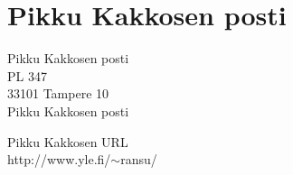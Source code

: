 \section{Pikku Kakkosen posti}

Pikku Kakkosen posti\\
PL 347\\
33101 Tampere 10\\
Pikku Kakkosen posti

Pikku Kakkosen URL\\
http://www.yle.fi/\(\sim\)ransu/